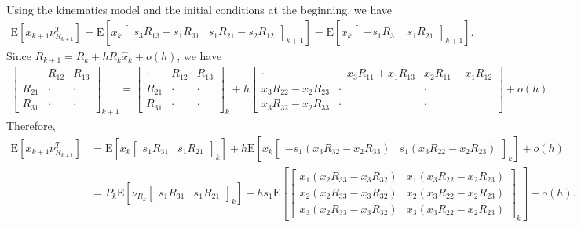 \documentclass[10pt]{article}
\newcommand{\expect}[1]{\ensuremath{\mathrm{E}\left[ #1 \right]}}
\begin{document}
Using the kinematics model and the initial conditions at the beginning, we have
\begin{align*}
	\expect{x_{k+1}\nu_{R_{k+1}}^T} = \expect{x_k\begin{bmatrix} s_3R_{13}-s_1R_{31} & s_1R_{21}-s_2R_{12} \end{bmatrix}_{k+1}} = \expect{x_k\begin{bmatrix} -s_1R_{31} & s_1R_{21} \end{bmatrix}_{k+1}}.
\end{align*}
Since $R_{k+1} = R_k + hR_k\hat{x}_k + o(h)$, we have
\begin{align*}
	\begin{bmatrix} \cdot & R_{12} & R_{13} \\ R_{21} & \cdot & \cdot \\ R_{31} & \cdot & \cdot \end{bmatrix}_{k+1} = \begin{bmatrix} \cdot & R_{12} & R_{13} \\ R_{21} & \cdot & \cdot \\ R_{31} & \cdot & \cdot \end{bmatrix}_k + h\begin{bmatrix} \cdot & -x_3R_{11}+x_1R_{13} & x_2R_{11}-x_1R_{12} \\ x_3R_{22}-x_2R_{23} & \cdot & \cdot \\ x_3R_{32}-x_2R_{33} & \cdot & \cdot \end{bmatrix} + o(h).
\end{align*}
Therefore,
\begin{align*}
	\expect{x_{k+1}\nu_{R_{k+1}}^T} &= \expect{x_k\begin{bmatrix} s_1R_{31} & s_1R_{21} \end{bmatrix}_k} + h\expect{x_k\begin{bmatrix} -s_1(x_3R_{32}-x_2R_{33}) & s_1(x_3R_{22}-x_2R_{23}) \end{bmatrix}_k} + o(h) \\
	&= P_k\expect{\nu_{R_k}\begin{bmatrix} s_1R_{31} & s_1R_{21} \end{bmatrix}_k} + hs_1\expect{\begin{bmatrix} x_1(x_2R_{33}-x_3R_{32}) & x_1(x_3R_{22}-x_2R_{23}) \\ x_2(x_2R_{33}-x_3R_{32}) & x_2(x_3R_{22}-x_2R_{23}) \\ x_3(x_2R_{33}-x_3R_{32}) & x_3(x_3R_{22}-x_2R_{23}) \end{bmatrix}_k} + o(h).
\end{align*}
\end{document}
